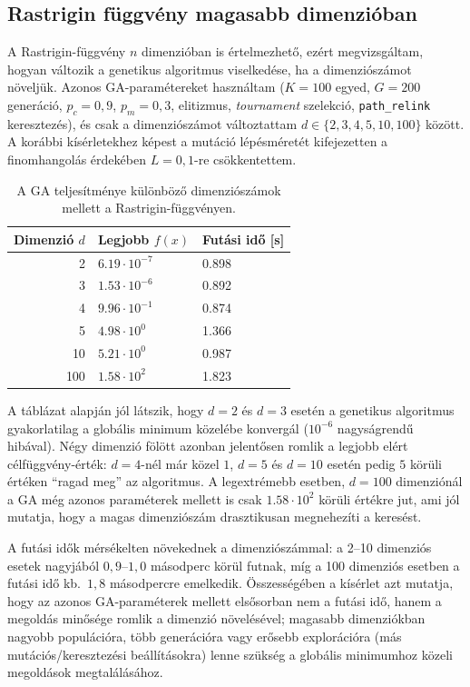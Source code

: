\documentclass[a4paper,12pt]{article}
\begin{document}
\subsection{Rastrigin függvény magasabb dimenzióban}

A Rastrigin-függvény $n$ dimenzióban is értelmezhető, ezért
megvizsgáltam, hogyan változik a genetikus algoritmus viselkedése,
ha a dimenziószámot növeljük. Azonos GA-paramétereket használtam
($K=100$ egyed, $G=200$ generáció, $p_c=0{,}9$, $p_m=0{,}3$,
elitizmus, \emph{tournament} szelekció, \texttt{path\_relink}
keresztezés), és csak a dimenziószámot változtattam
$d \in \{2,3,4,5,10,100\}$ között. A korábbi kísérletekhez képest
a mutáció lépésméretét kifejezetten a finomhangolás érdekében
$L = 0{,}1$-re csökkentettem.

\begin{table}[H]
  \centering
  \begin{tabular}{rll}
    \toprule
    Dimenzió $d$ & Legjobb $f(x)$ & Futási idő [s] \\
    \midrule
    2   & $6.19\cdot 10^{-7}$  & 0.898 \\
    3   & $1.53\cdot 10^{-6}$  & 0.892 \\
    4   & $9.96\cdot 10^{-1}$  & 0.874 \\
    5   & $4.98\cdot 10^{0}$   & 1.366 \\
    10  & $5.21\cdot 10^{0}$   & 0.987 \\
    100 & $1.58\cdot 10^{2}$   & 1.823 \\
    \bottomrule
  \end{tabular}
  \caption{A GA teljesítménye különböző dimenziószámok mellett a Rastrigin-függvényen.}
  \label{tab:rastrigin-nd}
\end{table}

A táblázat alapján jól látszik, hogy $d=2$ és $d=3$ esetén a genetikus
algoritmus gyakorlatilag a globális minimum közelébe konvergál
($10^{-6}$ nagyságrendű hibával). Négy dimenzió fölött azonban
jelentősen romlik a legjobb elért célfüggvény-érték: $d=4$-nél már
közel $1$, $d=5$ és $d=10$ esetén pedig $5$ körüli értéken ``ragad meg''
az algoritmus. A legextrémebb esetben, $d=100$ dimenziónál a GA még
azonos paraméterek mellett is csak $1.58\cdot 10^{2}$ körüli értékre
jut, ami jól mutatja, hogy a magas dimenziószám drasztikusan
megnehezíti a keresést.

A futási idők mérsékelten növekednek a dimenziószámmal: a 2–10
dimenziós esetek nagyjából $0{,}9$–$1{,}0$ másodperc körül futnak,
míg a 100 dimenziós esetben a futási idő kb.\ $1{,}8$ másodpercre
emelkedik. Összességében a kísérlet azt mutatja, hogy az azonos
GA-paraméterek mellett elsősorban nem a futási idő, hanem a
megoldás minősége romlik a dimenzió növelésével; magasabb
dimenziókban nagyobb populációra, több generációra vagy erősebb
explorációra (más mutációs/keresztezési beállításokra) lenne szükség
a globális minimumhoz közeli megoldások megtalálásához.
\end{document}
